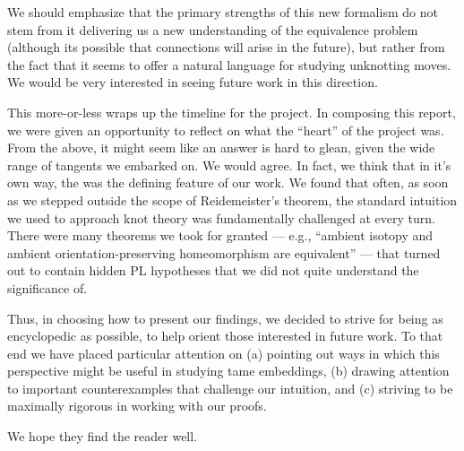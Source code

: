 We should emphasize that the primary strengths of this new formalism
do not stem from it delivering us a new understanding of the
equivalence problem (although its possible that connections will arise
in the future), but rather from the fact that it seems to offer a
natural language for studying unknotting moves. We would be very
interested in seeing future work in this direction.

This more-or-less wraps up the timeline for the project. In composing
this report, we were given an opportunity to reflect on what the
``heart'' of the project was. From the above, it might seem like an
answer is hard to glean, given the wide range of tangents we embarked
on. We would agree. In fact, we think that in it's own way, the
 was the defining feature of our
work. We found that often, as soon as we stepped outside the scope of
Reidemeister's theorem, the standard intuition we used to approach
knot theory was fundamentally challenged at every turn. There were
many theorems we took for granted --- e.g., ``ambient isotopy and
ambient orientation-preserving homeomorphism are equivalent'' --- that
turned out to contain hidden PL hypotheses that we did not quite
understand the significance of. %

Thus, in choosing how to present our findings, we decided to strive
for being as encyclopedic as possible, to help orient those interested
in future work. To that end we have placed particular attention on (a)
pointing out ways in which this perspective might be useful in
studying tame embeddings, (b) drawing attention to important
counterexamples that challenge our intuition, and (c) striving to be
maximally rigorous in working with our proofs.

We hope they find the reader well.

